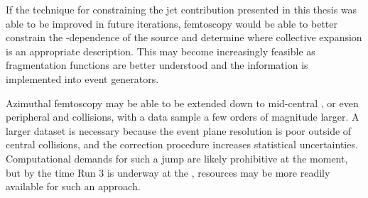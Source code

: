 If the technique for constraining the jet contribution presented in this thesis was able to be improved in future iterations, femtoscopy would be able to better constrain the \kt-dependence of the source and determine where collective expansion is an appropriate description.
This may become increasingly feasible as fragmentation functions are better understood and the information is implemented into \mc event generators.

Azimuthal femtoscopy may be able to be extended down to mid-central \pPb, or even peripheral \pPb and \pp collisions, with a data sample a few orders of magnitude larger.
A larger dataset is necessary because the event plane resolution is poor outside of central \pPb collisions, and the correction procedure increases statistical uncertainties.
Computational demands for such a jump are likely prohibitive at the moment, but by the time Run 3 is underway at the \lhc, resources may be more readily available for such an approach.
